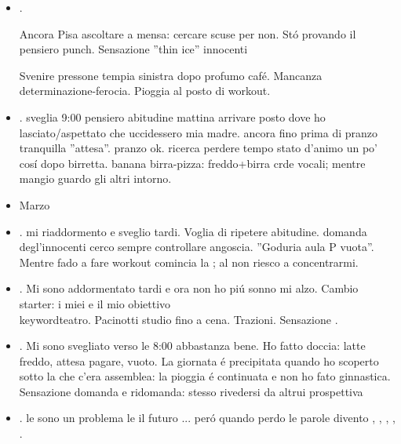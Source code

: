 \begin{itemize}
\item {}.

Ancora Pisa ascoltare a mensa: cercare scuse per non. St\'o provando il pensiero punch. Sensazione ''thin ice'' innocenti

Svenire pressone tempia sinistra dopo profumo caf\'e. Mancanza determinazione-ferocia. Pioggia al posto di workout.


\item {}. sveglia 9:00 pensiero abitudine mattina arrivare posto dove ho lasciato/aspettato che uccidessero mia madre. ancora fino prima di pranzo tranquilla ''attesa''. pranzo ok. ricerca perdere tempo stato d'animo un po' cos\'i dopo birretta. banana birra-pizza: freddo+birra crde vocali; mentre mangio guardo gli altri intorno.

\item Marzo

\item {}. mi riaddormento e sveglio tardi. Voglia di ripetere abitudine. domanda degl'innocenti cerco sempre controllare angoscia. ''Goduria aula P vuota''. Mentre fado a fare workout comincia la ; al  non riesco a concentrarmi.

\item {}. Mi sono addormentato tardi e ora non ho pi\'u sonno mi alzo. Cambio starter:  i miei  e il mio obiettivo \\keyword{teatro}. Pacinotti studio fino a cena. Trazioni. Sensazione .

\item {}. Mi sono svegliato verso le 8:00 abbastanza bene. Ho fatto doccia: latte freddo, attesa pagare, vuoto. La giornata \'e precipitata quando ho scoperto sotto la  che c'era assemblea: la pioggia \'e continuata e non ho fato ginnastica. Sensazione domanda e ridomanda:  stesso rivedersi da altrui prospettiva

\item {}. le  sono un problema le  il futuro ... per\'o quando perdo le parole divento , , , , .


\end{itemize}
